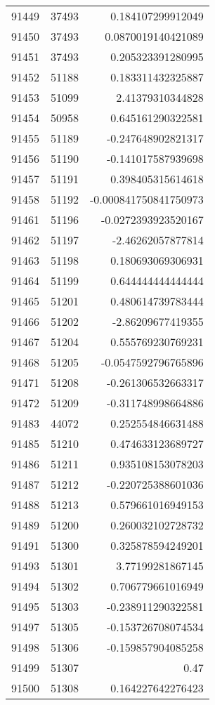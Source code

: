 \begin{tabular}{r | r | r}
91449 & 37493 & 0.184107299912049 \\
91450 & 37493 & 0.0870019140421089 \\
91451 & 37493 & 0.205323391280995 \\
91452 & 51188 & 0.183311432325887 \\
91453 & 51099 & 2.41379310344828 \\
91454 & 50958 & 0.645161290322581 \\
91455 & 51189 & -0.247648902821317 \\
91456 & 51190 & -0.141017587939698 \\
91457 & 51191 & 0.398405315614618 \\
91458 & 51192 & -0.000841750841750973 \\
91461 & 51196 & -0.0272393923520167 \\
91462 & 51197 & -2.46262057877814 \\
91463 & 51198 & 0.180693069306931 \\
91464 & 51199 & 0.644444444444444 \\
91465 & 51201 & 0.480614739783444 \\
91466 & 51202 & -2.86209677419355 \\
91467 & 51204 & 0.555769230769231 \\
91468 & 51205 & -0.0547592796765896 \\
91471 & 51208 & -0.261306532663317 \\
91472 & 51209 & -0.311748998664886 \\
91483 & 44072 & 0.252554846631488 \\
91485 & 51210 & 0.474633123689727 \\
91486 & 51211 & 0.935108153078203 \\
91487 & 51212 & -0.220725388601036 \\
91488 & 51213 & 0.579661016949153 \\
91489 & 51200 & 0.260032102728732 \\
91491 & 51300 & 0.325878594249201 \\
91493 & 51301 & 3.77199281867145 \\
91494 & 51302 & 0.706779661016949 \\
91495 & 51303 & -0.238911290322581 \\
91497 & 51305 & -0.153726708074534 \\
91498 & 51306 & -0.159857904085258 \\
91499 & 51307 & 0.47 \\
91500 & 51308 & 0.164227642276423 \\

\end{tabular}
